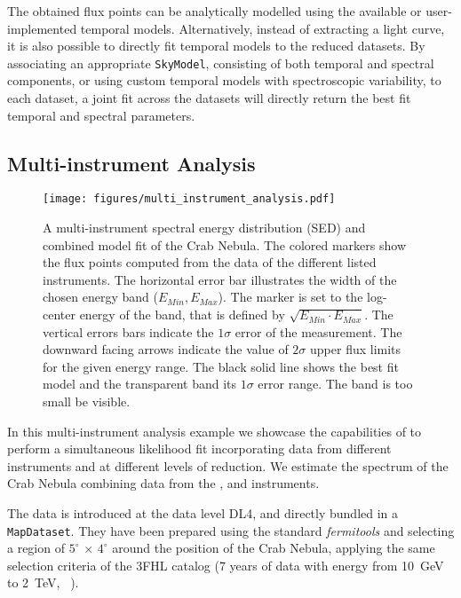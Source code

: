\documentclass[longauth]{aa}
\newcommand{\code}[1]{\texttt{#1}}
\begin{document}
%
The obtained flux points can be analytically modelled using the available or
user-implemented temporal models. Alternatively, instead of  extracting a
light curve, it is also possible to directly fit temporal models to the reduced
datasets. By associating an appropriate \code{SkyModel}, consisting of both temporal
and spectral components, or using custom temporal models with spectroscopic
variability, to each dataset, a joint fit across the datasets will directly
return the best fit temporal and spectral parameters.

\subsection{Multi-instrument Analysis}
\label{ssec:multi-instrument-analysis}
%
\begin{figure*}[t]
	\sidecaption
	\texttt{[image: figures/multi\_instrument\_analysis.pdf]}
	\caption{
        A multi-instrument spectral energy distribution (SED) and combined model fit
        of the Crab Nebula. The  colored markers show the flux points computed from
        the data of the different listed instruments. The horizontal error bar
        illustrates the width of the chosen energy band ($E_{Min}, E_{Max}$).
        The marker is set to the log-center energy of the band, that is
        defined by $\sqrt{E_{Min} \cdot E_{Max}}$. The vertical errors bars
        indicate the $1\sigma$ error of the measurement. The downward
        facing arrows indicate the value of $2\sigma$ upper flux limits
        for the given energy range. The black solid line shows the best
        fit model and the transparent band its $1\sigma$ error range.
		The band is too small be visible.
    }
	\label{fig:multi_instrument_analysis}
\end{figure*}
%
In this multi-instrument analysis example we showcase the capabilities of
\gammapy to perform a simultaneous likelihood fit incorporating data from
different instruments and at different levels of reduction. We estimate the
spectrum of the Crab Nebula combining data from the \fermi, \magic and \hawc
instruments.

The \fermi data is introduced at the data level DL4, and directly bundled in a
\code{MapDataset}. They have been prepared using the standard \textit{fermitools} \citep{Fermitools2019} and
selecting a region of $5^{\circ}\,\times\,4^{\circ}$ around the
position of the Crab Nebula, applying the same selection criteria of the 3FHL
catalog (7 years of data with energy from \SI{10}{GeV} to \SI{2}{TeV},
~\citealt{3FHL}).
\end{document}
